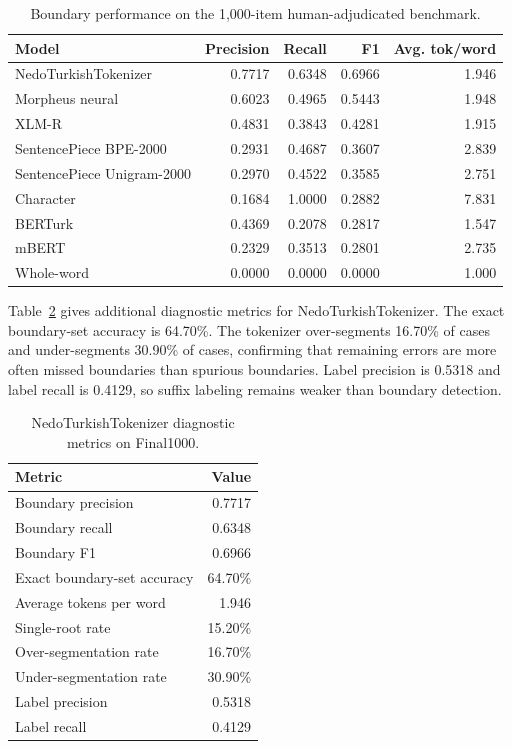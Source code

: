 \documentclass[11pt]{article}
\begin{document}
\begin{table}[h]
\centering
\caption{Boundary performance on the 1,000-item human-adjudicated benchmark.}
\label{tab:main}
\begin{tabular}{lrrrr}
\toprule
Model & Precision & Recall & F1 & Avg. tok/word \\
\midrule
NedoTurkishTokenizer & 0.7717 & 0.6348 & 0.6966 & 1.946 \\
Morpheus neural & 0.6023 & 0.4965 & 0.5443 & 1.948 \\
XLM-R & 0.4831 & 0.3843 & 0.4281 & 1.915 \\
SentencePiece BPE-2000 & 0.2931 & 0.4687 & 0.3607 & 2.839 \\
SentencePiece Unigram-2000 & 0.2970 & 0.4522 & 0.3585 & 2.751 \\
Character & 0.1684 & 1.0000 & 0.2882 & 7.831 \\
BERTurk & 0.4369 & 0.2078 & 0.2817 & 1.547 \\
mBERT & 0.2329 & 0.3513 & 0.2801 & 2.735 \\
Whole-word & 0.0000 & 0.0000 & 0.0000 & 1.000 \\
\bottomrule
\end{tabular}
\end{table}

Table~\ref{tab:diagnostic} gives additional diagnostic metrics for NedoTurkishTokenizer. The exact boundary-set accuracy is 64.70\%. The tokenizer over-segments 16.70\% of cases and under-segments 30.90\% of cases, confirming that remaining errors are more often missed boundaries than spurious boundaries. Label precision is 0.5318 and label recall is 0.4129, so suffix labeling remains weaker than boundary detection.

\begin{table}[h]
\centering
\caption{NedoTurkishTokenizer diagnostic metrics on Final1000.}
\label{tab:diagnostic}
\begin{tabular}{lr}
\toprule
Metric & Value \\
\midrule
Boundary precision & 0.7717 \\
Boundary recall & 0.6348 \\
Boundary F1 & 0.6966 \\
Exact boundary-set accuracy & 64.70\% \\
Average tokens per word & 1.946 \\
Single-root rate & 15.20\% \\
Over-segmentation rate & 16.70\% \\
Under-segmentation rate & 30.90\% \\
Label precision & 0.5318 \\
Label recall & 0.4129 \\
\bottomrule
\end{tabular}
\end{table}
\end{document}

